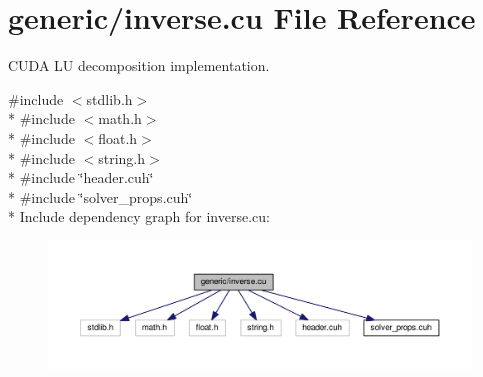 \hypertarget{inverse_8cu}{}\section{generic/inverse.cu File Reference}
\label{inverse_8cu}


C\+U\+DA LU decomposition implementation.  


{\ttfamily \#include $<$stdlib.\+h$>$}\\*
{\ttfamily \#include $<$math.\+h$>$}\\*
{\ttfamily \#include $<$float.\+h$>$}\\*
{\ttfamily \#include $<$string.\+h$>$}\\*
{\ttfamily \#include \char`\"{}header.\+cuh\char`\"{}}\\*
{\ttfamily \#include \char`\"{}solver\+\_\+props.\+cuh\char`\"{}}\\*
Include dependency graph for inverse.\+cu\+:\nopagebreak
\begin{figure}[H]
\begin{center}
\leavevmode
\includegraphics[width=350pt]{inverse_8cu__incl}
\end{center}
\end{figure}
